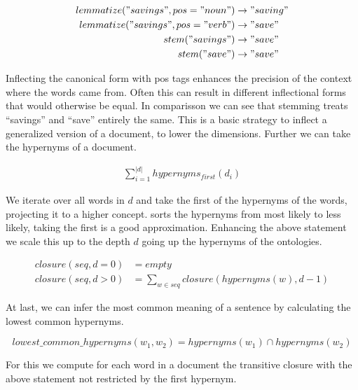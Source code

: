     \begin{equation}
    \begin{split}
      lemmatize("savings", pos="noun") &\to "saving" \\
      lemmatize("savings", pos="verb") &\to "save" \\
      stem("savings") &\to "save" \\
      stem("save") &\to "save"
    \end{split}
    \end{equation}

  Inflecting the canonical form with pos tags enhances the precision of the context where the words came from. Often this can result in different inflectional forms that would otherwise be equal. In comparisson we can see that stemming treats ``savings'' and ``save'' entirely the same. This is a basic strategy to inflect a generalized version of a document, to lower the dimensions. Further we can take the hypernyms of a document.

    \begin{equation}
    \begin{split}
      \sum_{i=1}^{|d|} hypernyms_{first}(d_i)
    \end{split}
    \end{equation}

  We iterate over all words in $d$ and take the first of the hypernyms of the words, projecting it to a higher concept. \wordnet{} sorts the hypernyms from most likely to less likely, taking the first is a good approximation.
  Enhancing the above statement we scale this up to the depth $d$ going up the hypernyms of the \wordnet{} ontologies.

    \begin{equation}
    \begin{split}
      closure(seq, d=0) &= empty \\
      closure(seq, d>0) &= \sum_{w \in seq} closure(hypernyms(w), d-1)
    \end{split}
    \end{equation}

  At last, we can infer the most common meaning of a sentence by calculating the lowest common hypernyms. 

    \begin{equation}
      lowest\_common\_hypernyms(w_1, w_2) = hypernyms(w_1) \cap hypernyms(w_2)
    \end{equation}

  For this we compute for each word in a document the transitive closure with the above statement not restricted by the first hypernym.


